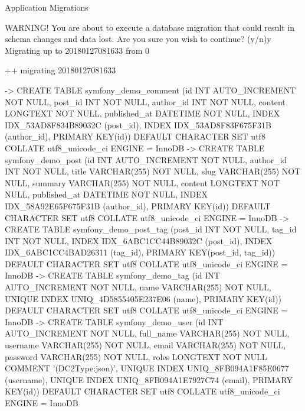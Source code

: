 \documentclass[a4paperpaper,openright]{book}
\newenvironment{Shaded}{}{}
\newcommand{\ExtensionTok}[1]{#1}
\newcommand{\NormalTok}[1]{#1}
\newcommand{\OperatorTok}[1]{\textcolor[rgb]{0.40,0.40,0.40}{#1}}
\newcommand{\StringTok}[1]{\textcolor[rgb]{0.25,0.44,0.63}{#1}}
\begin{document}
\begin{enumerate}
\begin{Shaded}
\begin{Highlighting}[]
     \ExtensionTok{Application}\NormalTok{ Migrations}


     \ExtensionTok{WARNING}\NormalTok{! You are about to execute a database migration that could result in schema changes and data lost. Are you sure you wish to continue? (y/n)}\ExtensionTok{y}
     \ExtensionTok{Migrating}\NormalTok{ up to 20180127081633 from 0}

       \ExtensionTok{++}\NormalTok{ migrating 20180127081633}

          \ExtensionTok{-}\OperatorTok{>}\NormalTok{ CREATE TABLE symfony_demo_comment (id INT AUTO_INCREMENT NOT NULL, post_id INT NOT NULL, author_id INT NOT NULL, content LONGTEXT NOT NULL, published_at DATETIME NOT NULL, INDEX IDX_53AD8F834B89032C (post_id), }\ExtensionTok{INDEX}\NormalTok{ IDX_53AD8F83F675F31B (author_id), }\ExtensionTok{PRIMARY}\NormalTok{ KEY(id)) }\ExtensionTok{DEFAULT}\NormalTok{ CHARACTER SET utf8 COLLATE utf8_unicode_ci ENGINE = InnoDB}
          \ExtensionTok{-}\OperatorTok{>}\NormalTok{ CREATE TABLE symfony_demo_post (id INT AUTO_INCREMENT NOT NULL, author_id INT NOT NULL, title VARCHAR(255) }\ExtensionTok{NOT}\NormalTok{ NULL, slug VARCHAR(255) }\ExtensionTok{NOT}\NormalTok{ NULL, summary VARCHAR(255) }\ExtensionTok{NOT}\NormalTok{ NULL, content LONGTEXT NOT NULL, published_at DATETIME NOT NULL, INDEX IDX_58A92E65F675F31B (author_id), }\ExtensionTok{PRIMARY}\NormalTok{ KEY(id)) }\ExtensionTok{DEFAULT}\NormalTok{ CHARACTER SET utf8 COLLATE utf8_unicode_ci ENGINE = InnoDB}
          \ExtensionTok{-}\OperatorTok{>}\NormalTok{ CREATE TABLE symfony_demo_post_tag (post_id INT NOT NULL, tag_id INT NOT NULL, INDEX IDX_6ABC1CC44B89032C (post_id), }\ExtensionTok{INDEX}\NormalTok{ IDX_6ABC1CC4BAD26311 (tag_id), }\ExtensionTok{PRIMARY}\NormalTok{ KEY(post_id, tag_id)) }\ExtensionTok{DEFAULT}\NormalTok{ CHARACTER SET utf8 COLLATE utf8_unicode_ci ENGINE = InnoDB}
          \ExtensionTok{-}\OperatorTok{>}\NormalTok{ CREATE TABLE symfony_demo_tag (id INT AUTO_INCREMENT NOT NULL, name VARCHAR(255) }\ExtensionTok{NOT}\NormalTok{ NULL, UNIQUE INDEX UNIQ_4D5855405E237E06 (name), }\ExtensionTok{PRIMARY}\NormalTok{ KEY(id)) }\ExtensionTok{DEFAULT}\NormalTok{ CHARACTER SET utf8 COLLATE utf8_unicode_ci ENGINE = InnoDB}
          \ExtensionTok{-}\OperatorTok{>}\NormalTok{ CREATE TABLE symfony_demo_user (id INT AUTO_INCREMENT NOT NULL, full_name VARCHAR(255) }\ExtensionTok{NOT}\NormalTok{ NULL, username VARCHAR(255) }\ExtensionTok{NOT}\NormalTok{ NULL, email VARCHAR(255) }\ExtensionTok{NOT}\NormalTok{ NULL, password VARCHAR(255) }\ExtensionTok{NOT}\NormalTok{ NULL, roles LONGTEXT NOT NULL COMMENT }\StringTok{'(DC2Type:json)'}\NormalTok{, UNIQUE INDEX UNIQ_8FB094A1F85E0677 (username), }\ExtensionTok{UNIQUE}\NormalTok{ INDEX UNIQ_8FB094A1E7927C74 (email), }\ExtensionTok{PRIMARY}\NormalTok{ KEY(id)) }\ExtensionTok{DEFAULT}\NormalTok{ CHARACTER SET utf8 COLLATE utf8_unicode_ci ENGINE = InnoDB}

\end{Highlighting}
\end{Shaded}
\end{enumerate}
\end{document}
